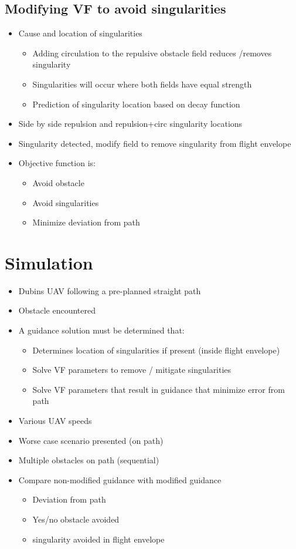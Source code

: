 \documentclass[conf]{new-aiaa}
\begin{document}
\subsection{Modifying VF to avoid singularities}
\begin{itemize}
	\item Cause and location of singularities
	\begin{itemize}
			\item Adding circulation to the repulsive obstacle field reduces /removes singularity
			\item Singularities will occur where both fields have equal strength
			\item Prediction of singularity location based on decay function
	\end{itemize}

	\item Side by side repulsion and repulsion+circ singularity locations
	\item Singularity detected, modify field to remove singularity from flight envelope
	\item Objective function is:
	\begin{itemize}
		\item Avoid obstacle 
		\item Avoid singularities
		\item Minimize deviation from path
	\end{itemize}

\end{itemize}

\section{Simulation}
\begin{itemize}
	\item Dubins UAV following a pre-planned straight path
	\item Obstacle encountered
	\item A guidance solution must be determined that:
	\begin{itemize}
		\item Determines location of singularities if present (inside flight envelope)
		\item Solve VF parameters to remove / mitigate singularities
		\item Solve VF parameters that result in guidance that  minimize error from path
	\end{itemize}

	\item Various UAV speeds
	\item Worse case scenario presented (on path)
	\item Multiple obstacles on path (sequential)
	\item Compare non-modified guidance with modified guidance
	\begin{itemize}
		\item Deviation from path
		\item Yes/no obstacle avoided
		\item singularity avoided in flight envelope
	\end{itemize}
\end{itemize}
\end{document}
